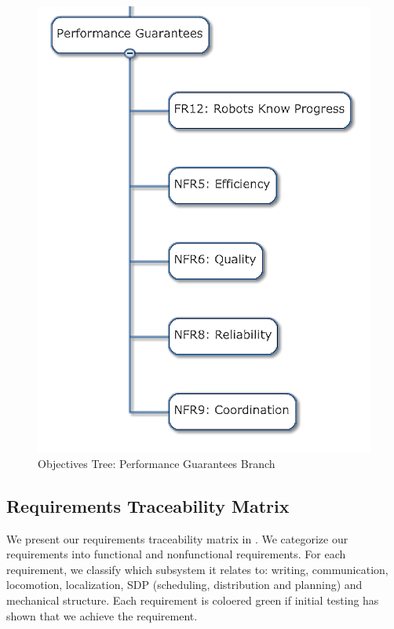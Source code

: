 \begin{figure}[!ht]
\centering
\includegraphics[width=0.98\columnwidth]{figs/objectives_tree/objectives_tree_performance.png}
\caption{Objectives Tree: Performance Guarantees Branch}
\label{fig:obj_tree_performance}
\end{figure}

\clearpage

\subsection{Requirements Traceability Matrix}
\label{sec:requirements_matrix}

We present our requirements traceability matrix in . We categorize our requirements into functional and nonfunctional requirements. For each requirement, we classify which subsystem it relates to: writing, communication, locomotion, localization, SDP (scheduling, distribution and planning) and mechanical structure. Each requirement is coloered green if initial testing has shown that we achieve the requirement. 

